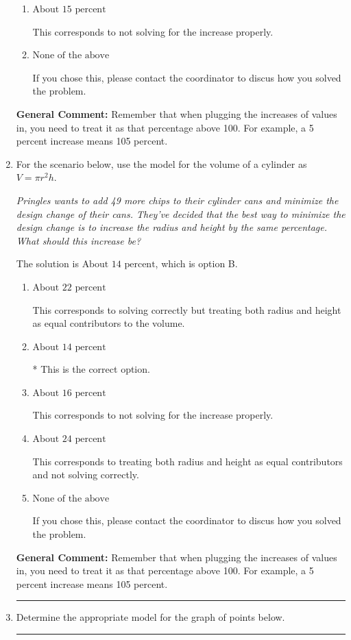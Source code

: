 \documentclass{extbook}[14pt]
\newcommand{\litem}[1]{\item #1

\rule{\textwidth}{0.4pt}}
\begin{document}
\begin{enumerate}
{\begin{enumerate}[label=\Alph*.]
This corresponds to solving correctly but treating both radius and height as equal contributors to the volume.
\item \( \text{About } 15 \text{ percent} \)

This corresponds to not solving for the increase properly.
\item \( \text{None of the above} \)

If you chose this, please contact the coordinator to discus how you solved the problem.
\end{enumerate}

\textbf{General Comment:} Remember that when plugging the increases of values in, you need to treat it as that percentage above 100. For example, a 5 percent increase means 105 percent.
}
\litem{
For the scenario below, use the model for the volume of a cylinder as $V = \pi r^2 h$.

\begin{center}
    \textit{ Pringles wants to add 49 \text{percent} more chips to their cylinder cans and minimize the design change of their cans. They've decided that the best way to minimize the design change is to increase the radius and height by the same percentage. What should this increase be? }
\end{center}
The solution is \( \text{About } 14 \text{ percent} \), which is option B.\begin{enumerate}[label=\Alph*.]
\item \( \text{About } 22 \text{ percent} \)

This corresponds to solving correctly but treating both radius and height as equal contributors to the volume.
\item \( \text{About } 14 \text{ percent} \)

* This is the correct option.
\item \( \text{About } 16 \text{ percent} \)

This corresponds to not solving for the increase properly.
\item \( \text{About } 24 \text{ percent} \)

This corresponds to treating both radius and height as equal contributors and not solving correctly.
\item \( \text{None of the above} \)

If you chose this, please contact the coordinator to discus how you solved the problem.
\end{enumerate}

\textbf{General Comment:} Remember that when plugging the increases of values in, you need to treat it as that percentage above 100. For example, a 5 percent increase means 105 percent.
}
\litem{
Determine the appropriate model for the graph of points below.

}
\end{enumerate}
\end{document}
